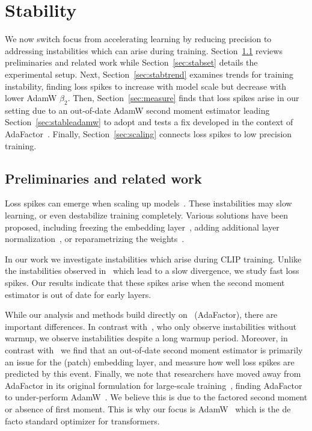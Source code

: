 \section{Stability}\label{sec:stability}

We now switch focus from accelerating learning by reducing precision to addressing instabilities which can arise during training. Section~\ref{sec:stabrel} reviews preliminaries and related work while Section~\ref{sec:stabset} details the experimental setup. Next, Section~\ref{sec:stabtrend} examines trends for training instability, finding loss spikes to increase with model scale but decrease with lower AdamW $\beta_2$.
Then, Section~\ref{sec:measure} finds that loss spikes arise in our setting due to an out-of-date AdamW second moment estimator leading Section~\ref{sec:stableadamw} to adopt and tests a fix developed in the context of AdaFactor~\cite{shazeer2018adafactor}. Finally, Section~\ref{sec:scaling} connects loss spikes to low precision training.

\subsection{Preliminaries and related work}\label{sec:stabrel}

Loss spikes can emerge when scaling up models~\cite{chen2021empirical, gilmerspikes, dehghani2023scaling, zhai2023stabilizing, zhai2023sigmoid, shazeer2018adafactor,zhang2022opt}. These instabilities may slow learning, or even destabilize training completely. Various solutions have been proposed, including freezing the embedding layer~\cite{chen2021empirical}, adding additional layer normalization~\cite{dehghani2023scaling, gilmerspikes}, or reparametrizing the weights~\cite{zhai2023stabilizing}.

In our work we investigate instabilities which arise during CLIP training. Unlike the instabilities observed in~\cite{dehghani2023scaling, zhai2023stabilizing} which lead to a slow divergence, we study fast loss spikes. Our results indicate that these spikes arise when the second moment estimator is out of date for early layers.

While our analysis and methods build directly on~\citet{shazeer2018adafactor} (AdaFactor), there are important differences. In contrast with~\citet{shazeer2018adafactor}, who only observe instabilities without warmup, we observe instabilities despite a long warmup period. Moreover, in contrast with~\citet{shazeer2018adafactor} we find that an out-of-date second moment estimator is primarily an issue for the (patch) embedding layer, and measure how well loss spikes are predicted by this event. Finally, we note that researchers have moved away from AdaFactor in its original formulation for large-scale training~\cite{rae2021scaling, chowdhery2022palm, zhai2021scaling}, finding AdaFactor to under-perform AdamW~\cite{rae2021scaling}. We believe this is due to the factored second moment or absence of first moment. This is why our focus is AdamW~\cite{loshchilov2018decoupled} which is the de facto standard optimizer for transformers.

